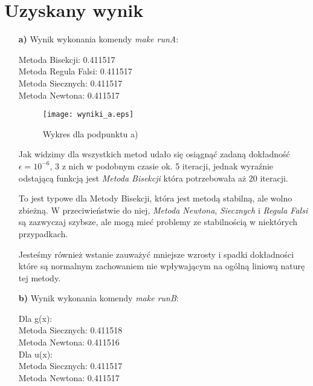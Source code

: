 \documentclass{article}
\begin{document}
  \section{Uzyskany wynik}
  \begin{enumerate}
    \item[\bf{a)}] Wynik wykonania komendy \textit{make runA}:
    \begin{center}
      \begin{tcolorbox}
        Metoda Bisekcji: 0.411517 \\
        Metoda Regula Falsi: 0.411517 \\
        Metoda Siecznych: 0.411517 \\
        Metoda Newtona: 0.411517
      \end{tcolorbox}
    \end{center}

    \begin{figure}[!ht]
      \begin{center}
          \texttt{[image: wyniki\_a.eps]}
          \caption{Wykres dla podpunktu a)}
      \end{center}
    \end{figure}

Jak widzimy dla wszystkich metod udało się osiągnąć zadaną dokładność $\epsilon = 10^{-6}$, 3 z nich w podobnym czasie ok. 5 iteracji, jednak wyraźnie odstającą funkcją jest \textit{Metoda Bisekcji} która potrzebowała aż 20 iteracji.

To jest typowe dla Metody Bisekcji, która jest metodą stabilną, ale wolno zbieżną. W przeciwieństwie do niej, \textit{Metoda Newtona}, \textit{Siecznych} i \textit{Regula Falsi} są zazwyczaj szybsze, ale mogą mieć problemy ze stabilnością w niektórych przypadkach.

Jesteśmy również wstanie zauważyć mniejsze wzrosty i spadki dokładności które są normalnym zachowaniem nie wpływającym na ogólną liniową naturę tej metody.

    \item[\bf{b)}] Wynik wykonania komendy \textit{make runB}:
    \begin{center}
      \begin{tcolorbox}
        Dla g(x):\\
        Metoda Siecznych: 0.411518 \\
        Metoda Newtona: 0.411516 \\
        Dla u(x):\\
        Metoda Siecznych: 0.411517 \\
        Metoda Newtona: 0.411517
      \end{tcolorbox}
    \end{center}
  \end{enumerate}
\end{document}
